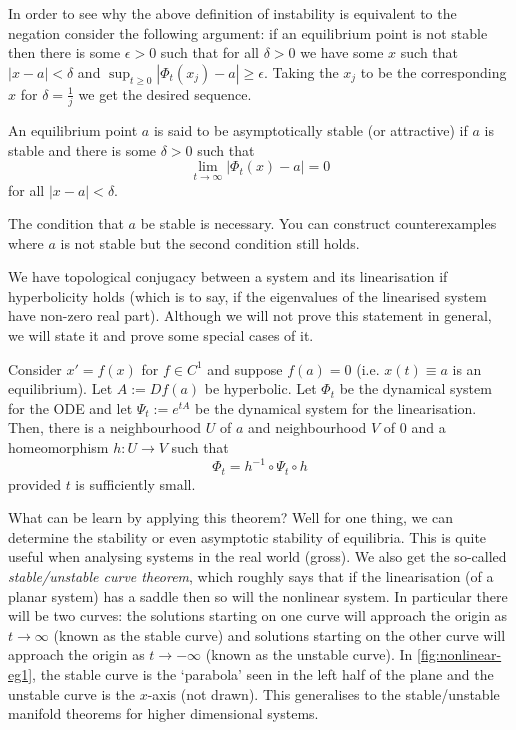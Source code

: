 \begin{remark}
    In order to see why the above definition of instability is equivalent to the negation consider the following argument: if an equilibrium point is not stable then there is some $\epsilon > 0$ such that for all $\delta > 0$ we have some $x$ such that $\left| x - a \right| < \delta$ and $\sup_{t \geq 0} \left| \Phi_t(x_j) - a \right| \geq \epsilon$. Taking the $x_j$ to be the corresponding $x$ for $\delta = \frac{1}{j}$ we get the desired sequence.
\end{remark}
\begin{definition}
An equilibrium point $a$ is said to be asymptotically stable (or attractive) if $a$ is stable and there is some $\delta > 0$ such that 
$$\lim_{t \to \infty} \left| \Phi_t(x) - a \right| = 0$$
for all $\left| x - a \right| < \delta$.
\end{definition}
\begin{remark}
    The condition that $a$ be stable is necessary. You can construct counterexamples where $a$ is not stable but the second condition still holds.
\end{remark}


We have topological conjugacy between a system and its linearisation if hyperbolicity holds (which is to say, if the eigenvalues of the linearised system have non-zero real part). Although we will not prove this statement in general, we will state it and prove some special cases of it.

\begin{theorem}\label{thm:hartman-grobman}
Consider $x' = f(x)$ for $f \in C^1$ and suppose $f(a) = 0$ (i.e. $x(t) \equiv a$ is an equilibrium). Let $A := Df(a)$ be hyperbolic. Let $\Phi_t$ be the dynamical system for the ODE and let $\Psi_t := e^{tA}$ be the dynamical system for the linearisation. Then, there is a neighbourhood $U$ of $a$ and neighbourhood $V$ of 0 and a homeomorphism $h: U \to V$ such that
$$ \Phi_t = h^{-1} \circ \Psi_t \circ h $$
provided $t$ is sufficiently small.
\end{theorem}

What can be learn by applying this theorem? Well for one thing, we can determine the stability or even asymptotic stability of equilibria. This is quite useful when analysing systems in the real world (gross). We also get the so-called \textit{stable/unstable curve theorem}, which roughly says that if the linearisation (of a planar system) has a saddle then so will the nonlinear system. In particular there will be two curves: the solutions starting on one curve will approach the origin as $t \to \infty$ (known as the stable curve) and solutions starting on the other curve will approach the origin as $t \to -\infty$ (known as the unstable curve). In \autoref{fig:nonlinear-eg1}, the stable curve is the `parabola' seen in the left half of the plane and the unstable curve is the $x$-axis (not drawn). This generalises to the stable/unstable manifold theorems for higher dimensional systems.

